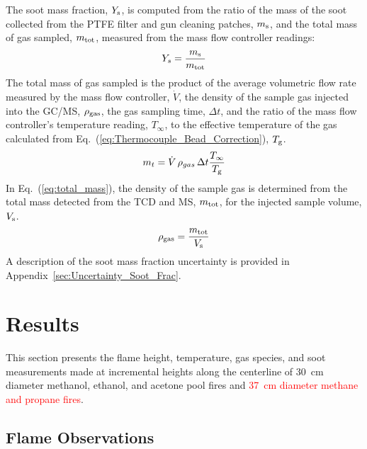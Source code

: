 \documentclass[12pt]{article}
\begin{document}
The soot mass fraction, $Y_{\rm s}$, is computed from the ratio of the mass of the soot collected from the PTFE filter and gun cleaning patches, $m_{\rm s}$, and the total mass of gas sampled, $m_{\rm tot}$, measured from the mass flow controller readings:
\begin{equation}\label{eq:soot_mass_frac}
Y_{s}= \frac{m_{\rm s}}{m_{\rm tot}}
\end{equation}
The total mass of gas sampled is the product of the average volumetric flow rate measured by the mass flow controller, $\dot{V}$, the density of the sample gas injected into the GC/MS, $\rho_{\rm gas}$, the gas sampling time, $\Delta t$, and the ratio of the mass flow controller's temperature reading, $T_{\infty}$, to the effective temperature of the gas calculated from Eq.~(\ref{eq:Thermocouple_Bead_Correction}), $T_{\rm g}$.
\begin{equation}\label{eq:total_mass}
m_{t}= \dot{V} \, \rho_{gas}\, \Delta t \frac{T_{\infty}}{T_{\rm g}}
\end{equation}
In Eq.~(\ref{eq:total_mass}), the density of the sample gas is determined from the total mass detected from the TCD and MS, $m_{\rm tot}$, for the injected sample volume, $V_{\rm s}$.
\begin{equation}\label{eq:gas_density}
\rho_{\rm gas}= \frac{m_{\rm tot}}{V_{\rm s}}
\end{equation}
A description of the soot mass fraction uncertainty is provided in Appendix~\ref{sec:Uncertainty_Soot_Frac}.


\clearpage

\section{Results}
\label{sec:Results}

This section presents the flame height, temperature, gas species, and soot measurements made at incremental heights along the centerline of 30~cm diameter methanol, ethanol, and acetone pool fires and \textcolor{red}{37~cm diameter methane and propane fires}.

\subsection{Flame Observations}
\label{ssec:Flame_Observations}
\end{document}
